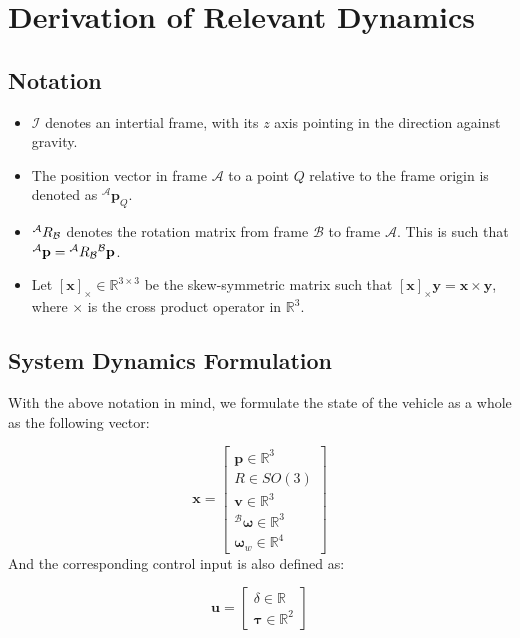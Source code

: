 \section{Derivation of Relevant Dynamics}

\subsection{Notation}

\begin{itemize}
  \item $\mathcal{I}$ denotes an intertial frame, with its $z$ axis pointing in the direction against gravity.
  \item The position vector in frame $\mathcal{A}$ to a point $Q$ relative to the frame origin is denoted as ${}^\mathcal{A}\mathbf{p}_{Q}$.
  \item ${}^\mathcal{A}{R}_\mathcal{B}$ denotes the rotation matrix from frame $\mathcal{B}$ to frame $\mathcal{A}$. This is such that ${}^\mathcal{A}\mathbf{p}={}^\mathcal{A}{R}_\mathcal{B}{}^\mathcal{B}\mathbf{p}$.
  \item Let $[\mathbf{x}]_\times \in \mathbb{R}^{3\times 3}$ be the skew-symmetric matrix such that $[\mathbf{x}]_\times\mathbf{y} = \mathbf{x} \times \mathbf{y}$, where $\times$ is the cross product operator in $\mathbb{R}^3$.
\end{itemize}


\subsection{System Dynamics Formulation}

With the above notation in mind, we formulate the state of the vehicle as a whole as the following vector:

$$
\mathbf{x} = 
\begin{bmatrix}
  \mathbf{p} \in \mathbb{R}^3 \\
  R \in SO(3) \\
  \mathbf{v} \in \mathbb{R}^3 \\
  {}^\mathcal{B}\boldsymbol{\omega} \in \mathbb{R}^3 \\
  \boldsymbol{\omega}_w \in \mathbb{R}^4
\end{bmatrix}
$$
And the corresponding control input is also defined as:

$$
\mathbf{u} = \begin{bmatrix}
  \delta \in \mathbb{R} \\
  \boldsymbol{\tau} \in \mathbb{R}^2
\end{bmatrix}
$$

